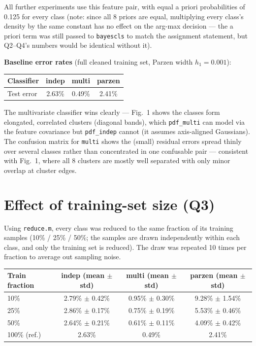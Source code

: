 \documentclass[11pt,a4paper]{article}
\begin{document}
All further experiments use this feature pair, with equal a priori
probabilities of 0.125 for every class (note: since all 8 priors are equal,
multiplying every class's density by the same constant has no effect on the
arg-max decision --- the a priori term was still passed to
\texttt{bayescls} to match the assignment statement, but Q2--Q4's numbers
would be identical without it).

\textbf{Baseline error rates} (full cleaned training set, Parzen width
$h_1 = 0.001$):

\begin{table}[h!]
\centering
\begin{tabular}{@{}lccc@{}}
\toprule
Classifier & indep & multi & parzen \\
\midrule
Test error & 2.63\% & 0.49\% & 2.41\% \\
\bottomrule
\end{tabular}
\end{table}

The multivariate classifier wins clearly --- Fig.~1 shows the classes form
elongated, correlated clusters (diagonal bands), which \texttt{pdf\_multi}
can model via the feature covariance but \texttt{pdf\_indep} cannot (it
assumes axis-aligned Gaussians). The confusion matrix for \texttt{multi}
shows the (small) residual errors spread thinly over several classes rather
than concentrated in one confusable pair --- consistent with Fig.~1, where
all 8 clusters are mostly well separated with only minor overlap at cluster
edges.

\section{Effect of training-set size (Q3)}

Using \texttt{reduce.m}, every class was reduced to the same fraction of its
training samples (10\% / 25\% / 50\%; the samples are drawn independently within
each class, and only the training set is reduced). The draw was repeated 10
times per fraction to average out sampling noise.

\begin{table}[h!]
\centering
\begin{tabular}{@{}lccc@{}}
\toprule
Train fraction & indep (mean $\pm$ std) & multi (mean $\pm$ std) & parzen (mean $\pm$ std) \\
\midrule
10\%  & 2.79\% $\pm$ 0.42\% & 0.95\% $\pm$ 0.30\% & 9.28\% $\pm$ 1.54\% \\
25\%  & 2.86\% $\pm$ 0.17\% & 0.75\% $\pm$ 0.19\% & 5.53\% $\pm$ 0.46\% \\
50\%  & 2.64\% $\pm$ 0.21\% & 0.61\% $\pm$ 0.11\% & 4.09\% $\pm$ 0.42\% \\
100\% (ref.) & 2.63\% & 0.49\% & 2.41\% \\
\bottomrule
\end{tabular}
\end{table}
\end{document}
